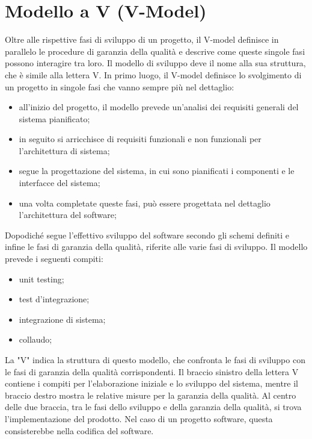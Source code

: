 \section{Modello a V (V-Model)}
Oltre alle rispettive fasi di sviluppo di un progetto, il V-model definisce in parallelo le procedure di garanzia della qualità e descrive come queste singole fasi possono interagire tra loro. Il modello di sviluppo deve il nome alla sua struttura, che è simile alla lettera V.
In primo luogo, il V-model definisce lo svolgimento di un progetto in singole fasi che vanno sempre più nel dettaglio:
\begin{itemize}
    \item all'inizio del progetto, il modello prevede un'analisi dei requisiti generali del sistema pianificato;
    \item in seguito si arricchisce di requisiti funzionali e non funzionali per l’architettura di sistema;
    \item segue la progettazione del sistema, in cui sono pianificati i componenti e le interfacce del sistema;
    \item una volta completate queste fasi, può essere progettata nel dettaglio l'architettura del software;
\end{itemize}
Dopodiché segue l’effettivo sviluppo del software secondo gli schemi definiti e infine le fasi di garanzia della qualità, riferite alle varie fasi di sviluppo. Il modello prevede i seguenti compiti:
\begin{itemize}
    \item unit testing;
    \item test d'integrazione;
    \item integrazione di sistema;
    \item collaudo;
\end{itemize}
La "V" indica la struttura di questo modello, che confronta le fasi di sviluppo con le fasi di garanzia della qualità corrispondenti. Il braccio sinistro della lettera V contiene i compiti per l'elaborazione iniziale e lo sviluppo del sistema, mentre il braccio destro mostra le relative misure per la garanzia della qualità. Al centro delle due braccia, tra le fasi dello sviluppo e della garanzia della qualità, si trova l'implementazione del prodotto. Nel caso di un progetto software, questa consisterebbe nella codifica del software.

